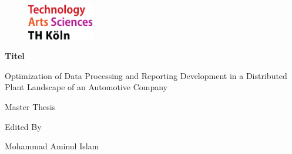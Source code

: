 \begin{titlepage}

\begin{center}

\begin{figure}[!ht]
		\includegraphics[width=0.26\textwidth]{images/THlogoheader.pdf}
\end{figure}

\vspace{0.4cm}

\begin{rmfamily}
\begin{huge}
\textbf{Titel}\\	
\end{huge}
\vspace{0.5cm}
\begin{LARGE}
Optimization of Data Processing and Reporting Development in a Distributed Plant Landscape of an Automotive Company\\
\end{LARGE}
\end{rmfamily}

\vspace{0.8cm}



\begin{LARGE}
\begin{scshape}
Master Thesis\\[0.8em]
\end{scshape}
\end{LARGE}

\begin{large}
Edited By\\ 
\vspace{0.3cm}
\begin{LARGE}
Mohammad Aminul Islam\\
\end{LARGE}
\end{large}


\end{center}
\end{titlepage}
